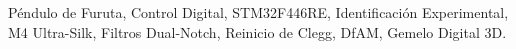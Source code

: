 \documentclass[conference]{IEEEtran}
\begin{document}
\renewcommand\IEEEkeywordsname{Palabras clave}
\begin{IEEEkeywords}
Péndulo de Furuta, Control Digital, STM32F446RE, Identificación Experimental, M4 Ultra-Silk, Filtros Dual-Notch, Reinicio de Clegg, DfAM, Gemelo Digital 3D.
\end{IEEEkeywords}









\end{document}
